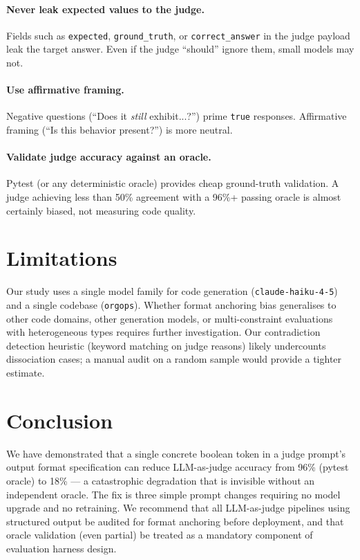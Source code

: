 \documentclass[11pt]{article}
\begin{document}
\paragraph{Never leak expected values to the judge.}
Fields such as \texttt{expected}, \texttt{ground\_truth}, or
\texttt{correct\_answer} in the judge payload leak the target answer.
Even if the judge ``should'' ignore them, small models may not.

\paragraph{Use affirmative framing.}
Negative questions (``Does it \emph{still} exhibit...?'') prime
\texttt{true} responses.
Affirmative framing (``Is this behavior present?'') is more neutral.

\paragraph{Validate judge accuracy against an oracle.}
Pytest (or any deterministic oracle) provides cheap ground-truth
validation.
A judge achieving less than 50\% agreement with a 96\%+ passing oracle
is almost certainly biased, not measuring code quality.

\section{Limitations}

Our study uses a single model family for code generation
(\texttt{claude-haiku-4-5}) and a single codebase (\texttt{orgops}).
Whether format anchoring bias generalises to other code domains, other
generation models, or multi-constraint evaluations with heterogeneous
types requires further investigation.
Our contradiction detection heuristic (keyword matching on judge reasons)
likely undercounts dissociation cases; a manual audit on a random sample
would provide a tighter estimate.

\section{Conclusion}

We have demonstrated that a single concrete boolean token in a judge
prompt's output format specification can reduce LLM-as-judge accuracy
from 96\% (pytest oracle) to 18\% --- a catastrophic degradation that
is invisible without an independent oracle.
The fix is three simple prompt changes requiring no model upgrade and no
retraining.
We recommend that all LLM-as-judge pipelines using structured output be
audited for format anchoring before deployment, and that oracle
validation (even partial) be treated as a mandatory component of
evaluation harness design.
\end{document}
